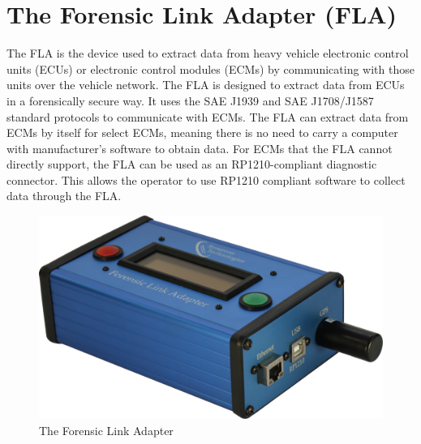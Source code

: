\documentclass[11pt, oneside]{book}
\begin{document}
\section{The Forensic Link Adapter (FLA)}
The FLA is the device used to extract data from heavy vehicle electronic control units (ECUs) or electronic control modules (ECMs) by communicating with those units over the vehicle network. The FLA is designed to extract data from ECUs in a forensically secure way. It uses the SAE J1939 and SAE J1708/J1587 standard protocols to communicate with ECMs. The FLA can extract data from ECMs by itself for select ECMs, meaning there is no need to carry a computer with manufacturer's software to obtain data. For ECMs that the FLA cannot directly support, the FLA can be used as an RP1210-compliant diagnostic connector. This allows the operator to use RP1210 compliant software to collect data through the FLA.

\begin{figure}[H] \begin{center}
	\vspace*{0.5cm}
	\includegraphics[width=.9\linewidth]{../media/fla_angled/fla_angle_1}
	\vspace*{0.5cm}
	\caption{\label{fla_angled_1} The Forensic Link Adapter }
\end{center} \end{figure}
\end{document}
